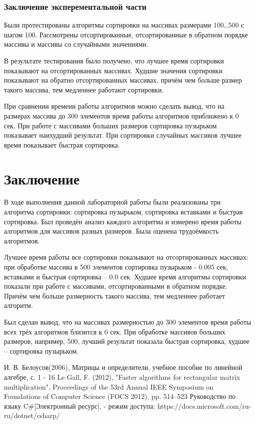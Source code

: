 \documentclass[12pt]{report}
\begin{document}
\subsection{Заключение эксперементальной части}
Были протестированы алгоритмы сортировки на массивах размерами 100…500 с шагом 100. Рассмотрены отсортированные, отсортированные в обратном порядке массивы и массивы со случайными значениями.

В результате тестирования было получено, что лучшее время сортировки показывают на отсортированных массивах. Худшие значения сортировки показывают на обратно отсортированных массивах, причём чем больше размер такого массива, тем медленнее работают сортировки. 

При сравнении времени работы алгоритмов можно сделать вывод, что на размерах массива до 300 элементов время работы алгоритмов приближено к 0 сек. При работе с массивами больших размеров сортировка пузырьком показывает наихудший результат. При сортировки случайных массивов лучшее время показывает быстрая сортировка.

\chapter*{Заключение}
В ходе выполнения данной лабораторной работы были реализованы три алгоритма сортировки: сортировка пузырьком, сортировка вставками и быстрая сортировка. Был проведён анализ каждого алгоритма и измерено время работы алгоритмов для массивов разных размеров. Была оценена трудоёмкость алгоритмов.

Лучшее время работы все сортировки показывают на отсортированных массивах: при обработке массива в 500 элементов сортировка пузырьком - 0.005 сек, вставками и быстрая сортировка – 0.0 сек. Худшее время алгоритмы сортировки показали при работе с массивами, отсортированными в обратном порядке. Причём чем больше размерность такого массива, тем медленнее работает алгоритм.

Был сделан вывод, что на массивах размерностью до 300 элементов время работы всех трёх алгоритмов близится к 0 сек. При обработке массивов больших размеров, например, 500, лучший результат показала быстрая сортировка, худшее – сортировка пузырьком.


\begin{thebibliography}{3}
	И. В. Белоусов(2006), Матрицы и определители, учебное пособие по линейной алгебре, с. 1 - 16
	Le Gall, F. (2012), "Faster algorithms for rectangular matrix multiplication", Proceedings of the 53rd Annual IEEE Symposium on Foundations of Computer Science (FOCS 2012), pp. 514–523
	Руководство по языку C\#[Электронный ресурс], - режим доступа: https://docs.microsoft.com/ru-ru/dotnet/csharp/
\end{thebibliography}
\end{document}

